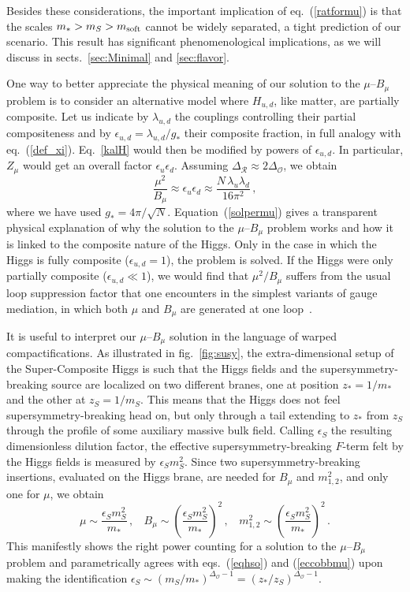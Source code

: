 \documentclass[a4paper,12pt]{article}
\newcommand{\beq}{\begin{equation}}
\newcommand{\eeq}{\end{equation}}
\def\eq#1{eq.~(\ref{#1})}
\def\fig#1{fig.~\ref{#1}}
\def\eq#1{eq.~(\ref{#1})}
\def\fig#1{fig.~\ref{#1}}
\def\O{\mathcal{O}}
\def\R{\mathcal{R}}
\def\mst{m_*}
\def\mS{m_S}
\def\msoft{m_{\rm soft}}
\begin{document}
Besides these considerations, the important implication of \eq{ratformu} is that the scales $\mst >\mS >\msoft$ cannot be widely separated, a tight prediction of our scenario. This result has significant phenomenological implications, as we will discuss in sects.~\ref{sec:Minimal} and \ref{sec:flavor}.

One way to better appreciate the physical meaning of our solution to the $\mu$--$B_\mu$ problem is to consider an alternative model where $H_{u,d}$, like matter,  are partially composite. Let us indicate by $\lambda_{u,d}$  the couplings controlling their partial compositeness and by $\epsilon_{u,d}= \lambda_{u,d}/g_*$
their composite fraction, in full analogy with \eq{def_xi}. Eq.~\eqref{kalH} would then be   modified by  powers of 
$\epsilon_{u,d}$. In particular, $Z_\mu$ would get an overall factor $\epsilon_{u}\epsilon_{d}$. Assuming  $\Delta_\R \approx 2\Delta_\O$, we obtain 
\beq
\frac{\mu^2}{B_\mu} \approx \epsilon_u\epsilon_d \approx
\frac{N\,\lambda_u\lambda_d}{16\pi^2}  \, ,
\label{solpermu}
\eeq
where we have used $g_*=4\pi/\sqrt{N}$.
Equation~(\ref{solpermu}) gives a transparent physical explanation of why the solution to the $\mu$--$B_\mu$ problem works and how it is linked to the composite nature of the Higgs. Only in the case in which the Higgs is fully composite ($\epsilon_{u,d}=1$), the problem is solved. If the Higgs were only partially composite ($\epsilon_{u,d}\ll1$), we would find that $\mu^2/B_\mu$ suffers from the usual loop suppression factor that one encounters in the simplest variants of gauge mediation, in which both $\mu$ and $B_\mu$ are generated at one loop~\cite{Dvali:1996cu}. 

It is useful to interpret our $\mu$--$B_\mu$ solution in the language of warped compactifications. As illustrated in \fig{fig:susy}, the extra-dimensional setup of the Super-Composite Higgs is such that the Higgs fields and the supersymmetry-breaking source are localized on two different branes, one at  position  $z_*=1/\mst$ and the other at $z_S=1/\mS$. This means that the Higgs does not  feel  supersymmetry-breaking head on, but only through  a tail extending to  $z_*$ from $z_S$ through the profile of some auxiliary massive bulk field. Calling $\epsilon_S$ the resulting dimensionless dilution factor, the effective supersymmetry-breaking $F$-term felt by the Higgs fields is measured by $\epsilon_S \mS^2$.
Since two supersymmetry-breaking insertions, evaluated on the Higgs brane, are needed for $B_\mu$ and $m_{1,2}^2$, and only one for $\mu$, we obtain
\beq
\mu \sim   \frac{  \epsilon_S \mS^2 }{ \mst  } \, , ~~~~
B_\mu \sim   \left(\frac{  \epsilon_S \mS^2 }{ \mst  }\right)^2 \, , ~~~~
m_{1,2}^2 \sim   \left(\frac{  \epsilon_S \mS^2 }{ \mst  }\right)^2\, .
\eeq
This manifestly shows the right power counting for a solution to the $\mu$--$B_\mu$ problem and parametrically agrees with eqs.~(\ref{eqhso}) and (\ref{eccobbmu}) upon making the identification $\epsilon_S \sim (\mS/\mst)^{\Delta_\O-1}=(z_*/z_S)^{\Delta_\O-1}$.
\end{document}
